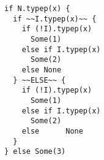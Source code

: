 \begin{lstlisting}[style=scalaioScala]
if N.typep(x) {
  if ~~I.typep(x)~~ {
    if (!I).typep(x)
      Some(1)
    else if I.typep(x)
      Some(2)
    else None
  } ~~ELSE~~ {
    if (!I).typep(x)
      Some(1)
    else if I.typep(x)
      Some(2)
    else      None
  }
} else Some(3)
\end{lstlisting}

